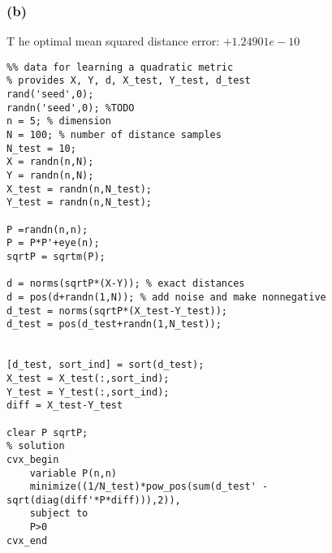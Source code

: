 \documentclass{article}
\begin{document}
\subsubsection*{(b)}
T he optimal mean squared distance error: $+1.24901e-10$
\begin{verbatim}
%% data for learning a quadratic metric
% provides X, Y, d, X_test, Y_test, d_test
rand('seed',0);
randn('seed',0); %TODO
n = 5; % dimension
N = 100; % number of distance samples
N_test = 10;
X = randn(n,N);
Y = randn(n,N);
X_test = randn(n,N_test);
Y_test = randn(n,N_test);

P =randn(n,n);
P = P*P'+eye(n);
sqrtP = sqrtm(P);

d = norms(sqrtP*(X-Y)); % exact distances
d = pos(d+randn(1,N)); % add noise and make nonnegative
d_test = norms(sqrtP*(X_test-Y_test));
d_test = pos(d_test+randn(1,N_test));


[d_test, sort_ind] = sort(d_test);
X_test = X_test(:,sort_ind);
Y_test = Y_test(:,sort_ind);
diff = X_test-Y_test

clear P sqrtP;
% solution
cvx_begin
    variable P(n,n)
    minimize((1/N_test)*pow_pos(sum(d_test' - sqrt(diag(diff'*P*diff))),2)),
    subject to
    P>0
cvx_end
\end{verbatim}
\end{document}

